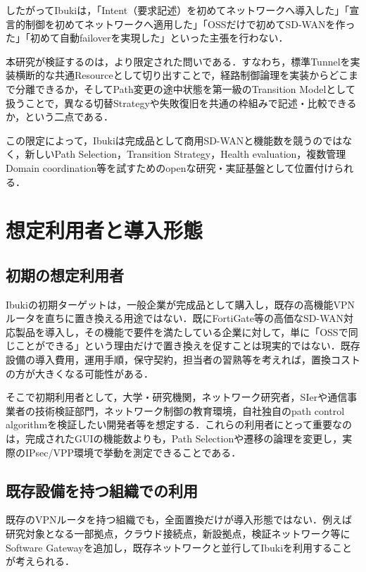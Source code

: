 \documentclass[11pt,a4paper,twoside]{ltjsarticle}
\begin{document}
したがってIbukiは，「Intent（要求記述）を初めてネットワークへ導入した」「宣言的制御を初めてネットワークへ適用した」「OSSだけで初めてSD-WANを作った」「初めて自動failoverを実現した」といった主張を行わない．

本研究が検証するのは，より限定された問いである．すなわち，標準Tunnelを実装横断的な共通Resourceとして切り出すことで，経路制御論理を実装からどこまで分離できるか，そしてPath変更の途中状態を第一級のTransition Modelとして扱うことで，異なる切替Strategyや失敗復旧を共通の枠組みで記述・比較できるか，という二点である．

この限定によって，Ibukiは完成品として商用SD-WANと機能数を競うのではなく，新しいPath Selection，Transition Strategy，Health evaluation，複数管理Domain coordination等を試すためのopenな研究・実証基盤として位置付けられる．

\section{想定利用者と導入形態}

\subsection{初期の想定利用者}

Ibukiの初期ターゲットは，一般企業が完成品として購入し，既存の高機能VPNルータを直ちに置き換える用途ではない．既にFortiGate等の高価なSD-WAN対応製品を導入し，その機能で要件を満たしている企業に対して，単に「OSSで同じことができる」という理由だけで置き換えを促すことは現実的ではない．既存設備の導入費用，運用手順，保守契約，担当者の習熟等を考えれば，置換コストの方が大きくなる可能性がある．

そこで初期利用者として，大学・研究機関，ネットワーク研究者，SIerや通信事業者の技術検証部門，ネットワーク制御の教育環境，自社独自のpath control algorithmを検証したい開発者等を想定する．これらの利用者にとって重要なのは，完成されたGUIの機能数よりも，Path Selectionや遷移の論理を変更し，実際のIPsec/VPP環境で挙動を測定できることである．

\subsection{既存設備を持つ組織での利用}

既存のVPNルータを持つ組織でも，全面置換だけが導入形態ではない．例えば研究対象となる一部拠点，クラウド接続点，新設拠点，検証ネットワーク等にSoftware Gatewayを追加し，既存ネットワークと並行してIbukiを利用することが考えられる．
\end{document}
